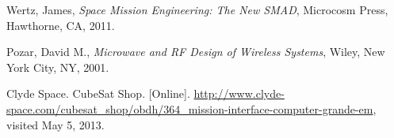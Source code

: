 \documentclass[12pt]{article}
\begin{document}
\begin{thebibliography}{9}
Wertz, James, \emph{Space Mission Engineering: The New SMAD}, Microcosm Press, Hawthorne, CA, 2011.

Pozar, David M., \emph{Microwave and RF Design of Wireless Systems}, Wiley, New York City, NY, 2001.


Clyde Space. CubeSat Shop. [Online]. \url{http://www.clyde-space.com/cubesat_shop/obdh/364_mission-interface-computer-grande-em}, visited May 5, 2013. 






\end{thebibliography}
\end{document}
